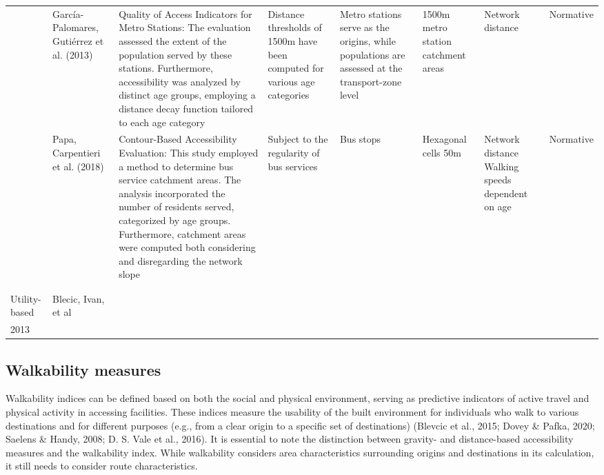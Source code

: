 \documentclass[
11pt, %
oneside, %
english, %
singlespacing, %
]{macthesis} %
\begin{document}
\begin{landscape}
\begin{table}
{\begin{tabular}[t]{l>{\raggedright\arraybackslash}p{5cm}>{\raggedright\arraybackslash}p{5cm}>{\raggedright\arraybackslash}p{5cm}>{\raggedright\arraybackslash}p{5cm}>{\raggedright\arraybackslash}p{5cm}ll}
 & García-Palomares, Gutiérrez et al. (2013) & Quality of Access Indicators for Metro Stations: The evaluation assessed the extent of the population served by these stations. Furthermore, accessibility was analyzed by distinct age groups, employing a distance decay function tailored to each age category & Distance thresholds of 1500m have been computed for various age categories & Metro stations serve as the origins, while populations are assessed at the transport-zone level & 1500m metro station catchment areas & Network distance & Normative\\
 & Papa, Carpentieri et al. (2018) & Contour-Based Accessibility Evaluation: This study employed a method to determine bus service catchment areas. The analysis incorporated the number of residents served, categorized by age groups. Furthermore, catchment areas were computed both considering and disregarding the network slope & Subject to the regularity of bus services & Bus stops & Hexagonal cells 50m & Network distance Walking speeds dependent on age & Normative\\
 &  &  &  &  &  &  \vphantom{1} & \\
\addlinespace
 &  &  &  &  &  &  & \\
Utility-based & Blecic, Ivan, et al &  &  &  &  &  & \\
2013 &  &  &  &  &  &  & \\
\bottomrule
\end{tabular}}
\end{table}
\end{landscape}

\subsection{Walkability measures}\label{walkability-measures}

Walkability indices can be defined based on both the social and physical environment, serving as predictive indicators of active travel and physical activity in accessing facilities. These indices measure the usability of the built environment for individuals who walk to various destinations and for different purposes (e.g., from a clear origin to a specific set of destinations) (Blevcic et al., 2015; Dovey \& Pafka, 2020; Saelens \& Handy, 2008; D. S. Vale et al., 2016). It is essential to note the distinction between gravity- and distance-based accessibility measures and the walkability index. While walkability considers area characteristics surrounding origins and destinations in its calculation, it still needs to consider route characteristics.
\end{document}
